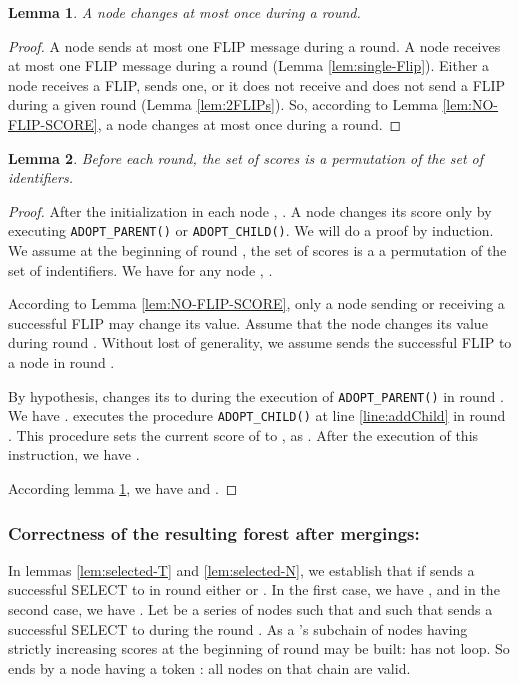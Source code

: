 \documentclass[twocolumn]{article}
\newtheorem{lemma}{Lemma}
\newcommand{\depends}[1]{}
\begin{document}
\begin{lemma}
  \label{lem:change_score-once}
A node  changes  at most once during a round.
\depends{\ref{lem:NO-FLIP-SCORE}, \red{lem:single-Flip}, \ref{lem:2FLIPs}}
\end{lemma}

\begin{proof}
A node sends at most one  FLIP message during a round.
A node receives at most one FLIP message during a round 
(Lemma \ref{lem:single-Flip}).
Either a node receives a FLIP, sends one, or it does not receive and does not send a FLIP during a given
round (Lemma \ref{lem:2FLIPs}).
So, according to Lemma \ref{lem:NO-FLIP-SCORE}, 
a node changes  at most once during a round.
 \end{proof}

\begin{lemma}
  \label{lem:permutation}
  Before each round, the set of scores is a permutation of the set of identifiers. 
\depends{\ref{lem:change_score_once}}
\end{lemma}

\begin{proof}
After the initialization in each node , . A node  changes its score only by executing \texttt{ADOPT\_PARENT()} or \texttt{ADOPT\_CHILD()}.
We will do a proof by induction.
We assume at the beginning of round , the set of scores is a a permutation of the set of indentifiers.
We have for any node , .

According to Lemma \ref{lem:NO-FLIP-SCORE}, only a node sending or receiving a successful FLIP may change its  value. 
Assume that the node  changes its  value during round . Without lost of generality, we assume 
sends the successful FLIP to a node  in round .

By hypothesis,  changes its  to  during the execution of \texttt{ADOPT\_PARENT()} in round . We have . 
 executes the procedure
\texttt{ADOPT\_CHILD()} at line \ref{line:addChild} 
in round . 
This procedure sets the current score of  
to , as .
After the execution of this instruction, we have
. 

According lemma \ref{lem:change_score-once}, we have 
 and . 
\end{proof}


\subsubsection{Correctness of the resulting forest after mergings:}

In lemmas \ref{lem:selected-T} and  \ref{lem:selected-N}, we establish that
if  sends a successful SELECT to  in round  either  or . In the first case, we have , and in the second case, 
we have .
Let  be a series of nodes  such that   
and such that  sends a successful SELECT to  during the round .
As a 's subchain of nodes having strictly increasing scores at the beginning of round  
may be built:  has not loop. So  ends by a node having a token : all nodes on that chain are valid.
\end{document}
